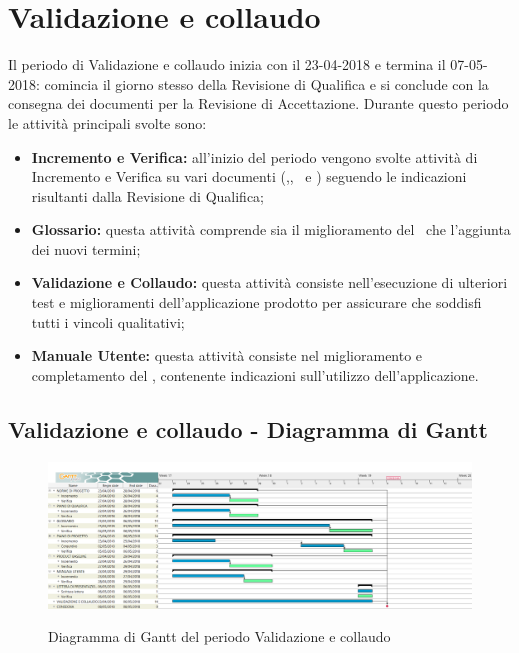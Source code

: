 \documentclass[PianoDiProgetto.tex]{subfiles}
\begin{document}
\section{Validazione e collaudo}
Il periodo di Validazione e collaudo inizia con il 23-04-2018 e termina il 07-05-2018: comincia il giorno stesso della Revisione di Qualifica e si conclude con la consegna dei documenti per la Revisione di Accettazione. Durante questo periodo le attività principali svolte sono:
\begin{itemize}
\item \textbf{Incremento e Verifica:} all’inizio del periodo vengono svolte attività di Incremento e Verifica su vari documenti (\normediprogetto,\pianodiprogetto, \pianodiqualifica\ e \product) seguendo le indicazioni risultanti dalla Revisione di Qualifica;
\item \textbf{Glossario:} questa attività comprende sia il miglioramento del \glossario\ che l’aggiunta dei nuovi termini;
\item \textbf{Validazione e Collaudo:} questa attività consiste nell’esecuzione di ulteriori test e miglioramenti dell'applicazione prodotto per assicurare che soddisfi tutti i vincoli qualitativi;
\item \textbf{Manuale Utente:} questa attività consiste nel miglioramento e completamento del \manualeutente, contenente indicazioni sull’utilizzo dell'applicazione.
\end{itemize}
\begin{landscape}
\subsection{Validazione e collaudo - Diagramma di Gantt}
\begin{figure}[ht]
	\includegraphics[width=21cm]{images/gantt/collaudo.png}
	\label{fig:foo}
	\caption{Diagramma di Gantt del periodo Validazione e collaudo}
\end{figure}
\end{landscape}	
\end{document}
